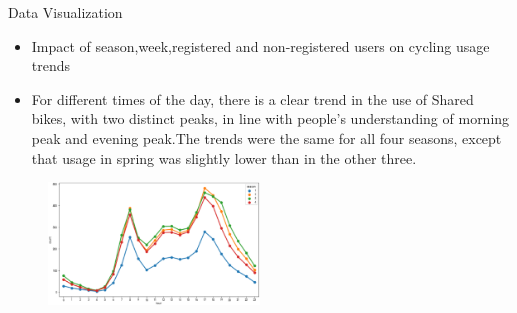 \documentclass[
 size=14pt,
 paper=smartboard,  %
 mode=present, 		%
 display=slides, 	%
 style=tuliplab,  	%
 pauseslide,
 fleqn,leqno]{powerdot}
\begin{document}
\begin{slide}[toc=,bm=]{Data  Visualization}
  \begin{center}

    {
      \begin{itemize}
        
          \item Impact of season,week,registered and non-registered users on cycling usage trends
      \end{itemize} 
      \begin{itemize}
        
        \item For different times of the day, there is a clear trend in the use of Shared bikes, with two distinct peaks, in line with people's understanding of morning peak and evening peak.The trends were the same for all four seasons, except that usage in spring was slightly lower than in the other three.
    \end{itemize} 
      \begin{figure}
        \centering
        \includegraphics[width=0.5\textwidth]{pic/three hour1 (2).eps}
      \end{figure} 
      
     
    }
    \end{center}
 


\end{slide}
\end{document}

